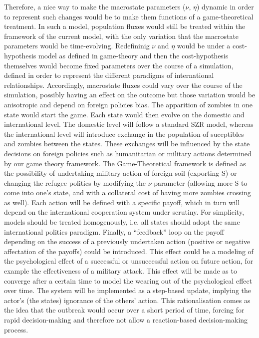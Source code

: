 \documentclass[11pt]{article} %
\begin{document}
Therefore, a nice way to make the macrostate parameters ($\nu$, $\eta$) dynamic in order to represent such changes would be to make them functions of a game-theoretical treatment. In such a model, population fluxes would still be treated within the framework of the current model, with the only variation that the macrostate parameters would be time-evolving. Redefininig $\nu$ and $\eta$ would be under a cost-hypothesis model as defined in game-theory and then the cost-hypothesis themselves would become fixed parameters over the course of a simulation, defined in order to represent the different paradigms of international relationships. Accordingly, macrostate fluxes could vary over the course of the simulation, possibly having an effect on the outcome but those variation would be anisotropic and depend on foreign policies bias. The apparition of zombies in one state would start the game. Each state would then evolve on the domestic and international level. The domestic level will follow a standard SZR model, whereas the international level will introduce exchange in the population of suceptibles and zombies between the states. These exchanges will be influenced by the state decisions on foreign policies such as humanitarian or military actions determined by our game theory framework. The Game-Theoretical framework is defined as the possibility of undertaking military action of foreign soil (exporting S) or changing the refugee politics by modifying the $\nu$ parameter (allowing more S to come into one's state, and with a collateral cost of having more zombies crossing as well). Each action will be defined with a specific payoff, which in turn will depend on the international cooperation system under scrutiny. For simplicity, models should be treated homogenously, i.e. all states should adopt the same international politics paradigm. Finally, a ``feedback'' loop on the payoff depending on the success of a previously undertaken action (positive or negative affectation of the payoffs) could be introduced. This effect could be a modeling of the psychological effect of a successful or unsuccessful action on future action, for example the effectiveness of a military attack. This effect will be made as to converge after a certain time to model the wearing out of the psychological effect over time. The system will be implemented as a step-based update, implying the actor's (the states) ignorance of the others' action. This rationalisation comes as the idea that the outbreak would occur over a short period of time, forcing for rapid decision-making and therefore not allow a reaction-based decision-making process. 
\end{document}
